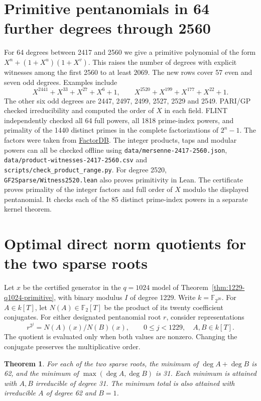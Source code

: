 \documentclass[11pt]{article}
\newtheorem{theorem}{Theorem}
\newcommand{\F}{\mathbb F_2}
\begin{document}
\section{Primitive pentanomials in 64 further degrees through 2560}
\label{sec:products-2560}
For 64 degrees between 2417 and 2560 we give a primitive polynomial
of the form \(X^n+(1+X^u)(1+X^v)\). This raises the number of degrees
with explicit witnesses among the first 2560 to at least \(2069\).
The new rows cover 57 even and seven odd degrees. Examples include
\[
 X^{2441}+X^{33}+X^{27}+X^6+1,\qquad
 X^{2520}+X^{199}+X^{177}+X^{22}+1 .
\]
The other six odd degrees are 2447, 2497, 2499, 2527, 2529 and 2549.
PARI/GP checked irreducibility and computed the order of \(X\) in
each field. FLINT independently checked all 64 full powers, all
1818 prime-index powers, and primality of the 1440 distinct primes in
the complete factorizations of \(2^n-1\). The factors were taken from
\href{https://factordb.com/index.php?query=2%5E2441-1}{FactorDB}.
The integer products, taps
and modular powers can all be checked offline using
\nolinkurl{data/mersenne-2417-2560.json},
\nolinkurl{data/product-witnesses-2417-2560.csv}
and \nolinkurl{scripts/check_product_range.py}.
For degree 2520, \nolinkurl{GF2Sparse/Witness2520.lean} also proves
primitivity in Lean. The certificate proves primality of the integer
factors and full order of \(X\) modulo the displayed pentanomial.
It checks each of the 85 distinct prime-index powers in a separate
kernel theorem.

\section{Optimal direct norm quotients for the two sparse roots}
\label{sec:1229-norm-height}
Let \(x\) be the certified generator in the \(q=1024\) model of
Theorem~\ref{thm:1229-q1024-primitive}, with binary modulus \(I\) of
degree 1229. Write \(k=\mathbb F_{2^{20}}\). For \(A\in k[T]\), let
\(N(A)\in\F[T]\) be the product of its twenty coefficient conjugates.
For either designated pentanomial root \(r\), consider representations
\[
 r^{2^j}=N(A)(x)/N(B)(x),\qquad 0\le j<1229,\quad A,B\in k[T].
\]
The quotient is evaluated only when both values are nonzero.
Changing the conjugate preserves the multiplicative order.

\begin{theorem}
For each of the two sparse roots, the minimum of
\(\deg A+\deg B\) is 62, and the minimum of
\(\max(\deg A,\deg B)\) is 31. Each minimum is attained with
\(A,B\) irreducible of degree 31. The minimum total is also
attained with irreducible \(A\) of degree 62 and \(B=1\).
\end{theorem}
\end{document}
